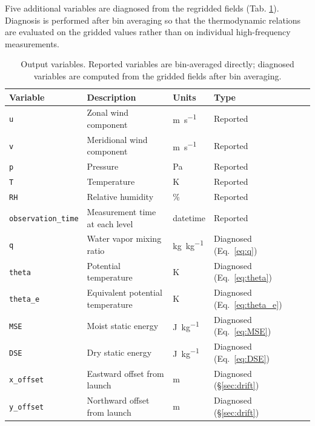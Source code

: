 \documentclass[11pt]{article}
\begin{document}
Five additional variables are diagnosed from the regridded fields (Tab. \ref{tab:variables}).  Diagnosis is performed after bin averaging so that the thermodynamic relations are evaluated on the gridded values rather than on individual high-frequency measurements. 

\begin{table}[h]
\centering
\caption{Output variables.  Reported variables are bin-averaged directly; diagnosed variables are computed from the gridded fields after bin averaging.}
\label{tab:variables}
\begin{tabular}{lllll}
\toprule
Variable & Description & Units & Type \\
\midrule
\texttt{u}                  & Zonal wind component             & \si{m\per s}    & Reported \\
\texttt{v}                  & Meridional wind component         & \si{m\per s}    & Reported \\
\texttt{p}                  & Pressure                          & \si{Pa}         & Reported \\
\texttt{T}                  & Temperature                       & \si{K}          & Reported \\
\texttt{RH}                 & Relative humidity                 & \%              & Reported \\
\texttt{observation\_time}  & Measurement time at each level    & datetime        & Reported \\
\texttt{q}                  & Water vapor mixing ratio          & \si{kg\per kg}  & Diagnosed (Eq.~\ref{eq:q}) \\
\texttt{theta}              & Potential temperature              & \si{K}          & Diagnosed (Eq.~\ref{eq:theta}) \\
\texttt{theta\_e}           & Equivalent potential temperature   & \si{K}          & Diagnosed (Eq.~\ref{eq:theta_e}) \\
\texttt{MSE}                & Moist static energy               & \si{J\per kg}   & Diagnosed (Eq.~\ref{eq:MSE}) \\
\texttt{DSE}                & Dry static energy                 & \si{J\per kg}   & Diagnosed (Eq.~\ref{eq:DSE}) \\
\texttt{x\_offset}          & Eastward offset from launch        & \si{m}          & Diagnosed (\S\ref{sec:drift}) \\
\texttt{y\_offset}          & Northward offset from launch       & \si{m}          & Diagnosed (\S\ref{sec:drift}) \\

\end{tabular}
\end{table}
\end{document}
